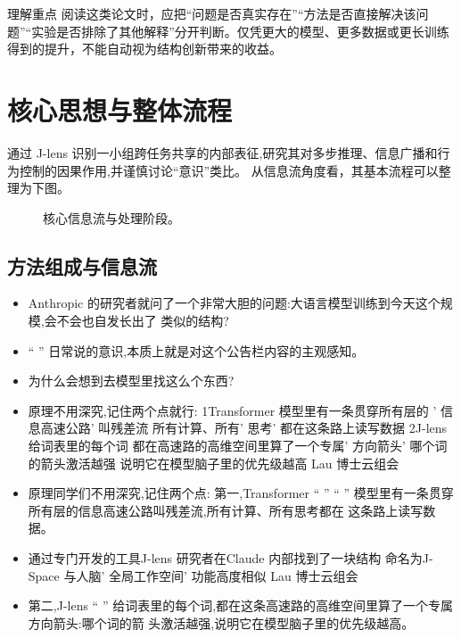 \documentclass[UTF8,11pt,a4paper]{ctexart}
\begin{document}
\begin{notebox}{理解重点}
阅读这类论文时，应把“问题是否真实存在”“方法是否直接解决该问题”“实验是否排除了其他解释”分开判断。仅凭更大的模型、更多数据或更长训练得到的提升，不能自动视为结构创新带来的收益。
\end{notebox}

\section{核心思想与整体流程}
通过 J-lens 识别一小组跨任务共享的内部表征,研究其对多步推理、信息广播和行为控制的因果作用,并谨慎讨论“意识”类比。 从信息流角度看，其基本流程可以整理为下图。

\begin{figure}[H]
\centering
{}
\caption{核心信息流与处理阶段。}
\end{figure}

\subsection{方法组成与信息流}
\begin{itemize}
\item Anthropic 的研究者就问了一个非常大胆的问题:大语言模型训练到今天这个规模,会不会也自发长出了 类似的结构?
\item “ ” 日常说的意识,本质上就是对这个公告栏内容的主观感知。
\item 为什么会想到去模型里找这么个东西?
\item 原理不用深究,记住两个点就行: 1Transformer 模型里有一条贯穿所有层的 ' 信息高速公路' 叫残差流 所有计算、所有' 思考' 都在这条路上读写数据 2J-lens 给词表里的每个词 都在高速路的高维空间里算了一个专属' 方向箭头' 哪个词的箭头激活越强 说明它在模型脑子里的优先级越高 Lau 博士云组会
\item 原理同学们不用深究,记住两个点: 第一,Transformer “ ” “ ” 模型里有一条贯穿所有层的信息高速公路叫残差流,所有计算、所有思考都在 这条路上读写数据。
\item 通过专门开发的工具J-lens 研究者在Claude 内部找到了一块结构 命名为J-Space 与人脑' 全局工作空间' 功能高度相似 Lau 博士云组会
\item 第二,J-lens “ ” 给词表里的每个词,都在这条高速路的高维空间里算了一个专属方向箭头:哪个词的箭 头激活越强,说明它在模型脑子里的优先级越高。
\end{itemize}
\end{document}
